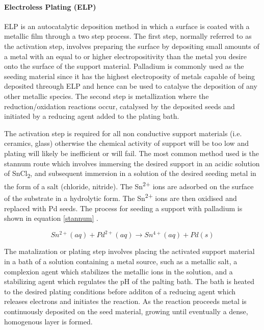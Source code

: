 \paragraph*{Electroless Plating (ELP)}\label{ELPREV}
ELP is an autocatalytic deposition method in which a surface is coated with a metallic film through a two step process. The first step, normally referred to as the activation step, involves preparing the surface by depositing small amounts of a metal with an equal to or higher electropositivity than the metal you desire onto the surface of the support material. Palladium is commonly used as the seeding material since it has the highest electroposity of metals capable of being deposited threough ELP and hence can be used to catalyse the deposition of any other metallic species. \cite{Exter2015}
The second step is metallization where the reduction/oxidation reactions occur, catalysed by the deposited seeds and initiated by a reducing agent added to the plating bath.

The activation step is required for all non conductive support materials (i.e. ceramics, glass) otherwise the chemical activity of support will be too low and plating will likely be inefficient or will fail. The most common method used is the stannum route which involves immersing the desired support in an acidic solution of SnCl\textsubscript{2}, and subsequent immersion in a solution of the desired seeding metal in the form of a salt (chloride, nitride). The Sn\textsuperscript{2+} ions are adsorbed on the surface of the substrate in a hydrolytic form. The Sn\textsuperscript{2+} ions are then oxidised and replaced with Pd seeds. \cite{Exter2015} The process for seeding a support with palladium is shown in equation \ref{stannum} \cite{Exter2015}.

\begin{equation} \label{stannum}
    Sn^{2+} (aq) + Pd^{2+} (aq) \rightarrow Sn^{4+} (aq) + Pd(s)
\end{equation}

The matalization or plating step involves placing the activated support material in a bath of a solution containing a metal source, such as a metallic salt, a complexion agent which stabilizes the metallic ions in the solution, and a stabilizing agent which regulates the pH of the palting bath. The bath is heated to the desired plating conditions before additon of a reducing agent which releases electrons and initiates the reaction. As the reaction proceeds metal is continuously deposited on the seed material, growing until eventually a dense, homogenous layer is formed. 

